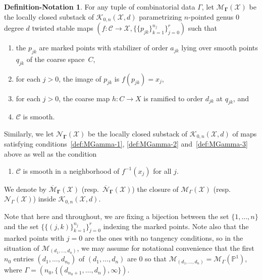 \documentclass[11pt]{amsart}
\numberwithin{equation}{section}
\theoremstyle{definition}
\newtheorem{defnote}[theorem]{Definition-Notation}
\theoremstyle{remark}
\newcommand{\calK}{\mathcal K}
\newcommand{\calM}{\mathcal M}
\newcommand{\calN}{\mathcal N}
\newcommand{\calX}{\mathcal X}
\newcommand{\calC}{\mathcal C}
\newcommand{\mapsd}{\mathcal{M}_{(d_1, \ldots, d_n)}}
\begin{document}
\begin{defnote}\label{def:MGamma} For any tuple of combinatorial data $\Gamma$, let $\boldsymbol{\mathcal{M}_\Gamma(\calX)}$ be the locally closed substack of $\calK_{0,n}(\calX, d)$ parametrizing $n$-pointed genus $0$ degree $d$ twisted stable maps $(f \colon \calC \to \calX, \{\{p_{jk}\}_{k = 1}^{n_j}\}_{j = 0}^r)$ such that
\begin{enumerate}
    \item\label{def:MGamma-1} the $p_{jk}$ are marked points with stabilizer of order $a_{jk}$ lying over smooth points $q_{jk}$ of the coarse space~$C$,
    \item\label{def:MGamma-2} for each $j > 0$, the image of $p_{jk}$ is $f(p_{jk}) = x_j$,
    \item\label{def:MGamma-3} for each $j > 0$, the coarse map $h \colon C \to X$ is ramified to order $d_{jk}$ at $q_{jk}$, and
    \item\label{def:MGamma-4} $\calC$ is smooth. 
\end{enumerate}

\noindent Similarly, we let $\boldsymbol{\calN_{\Gamma}(\calX)}$ be the locally closed substack of $\calK_{0,n}(\calX,d)$ of maps satisfying conditions~\eqref{def:MGamma-1}, \eqref{def:MGamma-2} and~\eqref{def:MGamma-3} above as well as the condition 
\begin{enumerate}[label={\rm(4${}^\prime$)}, ref=4${}^\prime$]
\item\label{def:MGamma-4'} $\calC$ is smooth in a neighborhood of $f^{-1}(x_j)$ for all $j$.
\end{enumerate}

\noindent We denote by $\boldsymbol{\overline{\calM}_{\Gamma}(\calX)}$ (resp.\ $\boldsymbol{\overline{\calN}_{\Gamma}(\calX)}$) the closure of $\calM_{\Gamma}(\calX)$ (resp.\ $\calN_{\Gamma}(\calX)$) inside $\calK_{0,n}(\calX, d)$. 
\end{defnote} 

Note that here and throughout, we are fixing a bijection between the set $\{1, \ldots, n\}$ and the set $\{ \{(j,k)\}_{k = 1}^{n_j} \}_{j = 0}^r$ indexing the marked points. Note also that the marked points with $j = 0$ are the ones with no tangency conditions, so in the situation of $\mapsd$, we may assume for notational convenience that the first $n_0$ entries $(d_1, \ldots, d_{n_0})$ of $(d_1, \ldots, d_n)$ are $0$ so that $\mapsd = \calM_\Gamma(\mathbb{P}^1)$, where $\Gamma = (n_0, \{(d_{n_0 + 1}, \ldots, d_{n}), \infty\})$.
\end{document}
